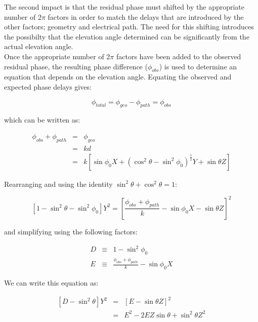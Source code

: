 \documentclass{article}
\begin{document}
\noindent
The second impact is that the residual phase must shifted by the appropriate
number of 2$\pi$ factors in order to match the delays that are introduced
by the other factors; geometry and electrical path. The need for this shifting
introduces the possibilty that the elevation angle determined can be
significantly from the actual elevation angle. \\

\noindent
Once the appropriate number of 2$\pi$ factors have been added to the
observed residual phase, the resulting phase difference ($\phi_{obs}$) is
used to determine an equation that depends on the elevation angle. Equating
the observed and expected phase delays gives:

\begin{equation}
\phi_{total} = \phi_{geo} - \phi_{path} = \phi_{obs}
\end{equation}

\noindent
which can be written as:

\begin{eqnarray}
\phi_{obs} + \phi_{path} & = & \phi_{geo} \\
                         & = & k d \\
                         & = & k \left[
                                 \sin \phi_0 X +
                                 \left( \cos^2\theta - 
																				\sin^2\phi_0 \right)^\frac{1}{2} Y +
                                 \sin \theta Z
                                 \right]
\end{eqnarray}

\noindent
Rearranging and using the identity $\sin^2 \theta + \cos^2 \theta = 1$:

\begin{equation}
\left[1 - \sin^2\theta - \sin^2\phi_0 \right] Y^2 =
	\left[ \frac{\phi_{obs} + \phi_{path}}{k} - \sin \phi_0 X - \sin \theta Z
	\right]^2
\end{equation}

\noindent
and simplifying using the following factors:

\begin{eqnarray}
D & \equiv & 1 - \sin^2 \phi_0 \\
E & \equiv & \frac{\phi_{obs} + \phi_{path}}{k} - \sin \phi_0 X
\end{eqnarray}

\noindent
We can write this equation as:

\begin{eqnarray}
\left[ D - \sin^2 \theta \right] Y^2 & = & \left[ E - \sin \theta Z \right]^2\\
& = & E^2 - 2 E Z \sin \theta + \sin^2 \theta Z^2
\end{eqnarray}
\end{document}
